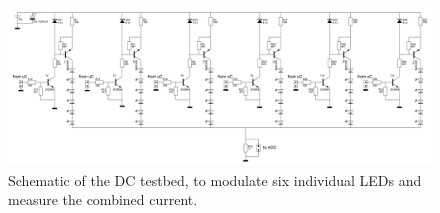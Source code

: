 \begin{figure}
	\includegraphics[angle=90,width=\textwidth,height=.9\textheight,keepaspectratio]{chapters/appendix/dc-test-bed/dc-test-bed-schematic.jpg}
	\caption{Schematic of the DC testbed, to modulate six individual LEDs and measure the combined current.}
	\label{fig:dc-test-bed-schematic}
\end{figure}

